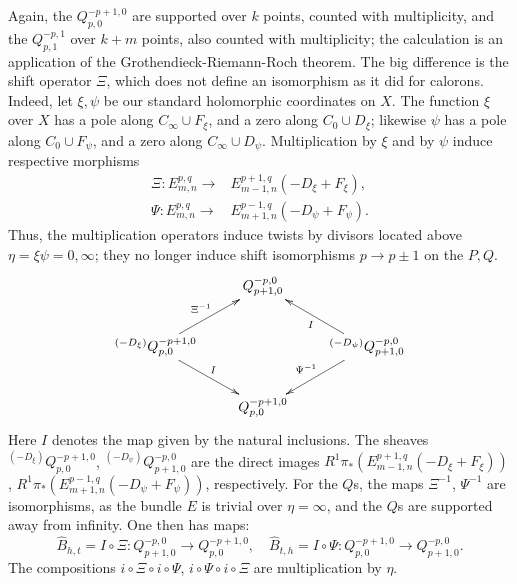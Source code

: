 \documentclass[12pt]{article}
\theoremstyle{definition}
\theoremstyle{remark}
\numberwithin{theorem}{section}
\begin{document}
Again, the $Q_{p,0}^{-p+1,0}$ are supported over $k$ points, counted with multiplicity, and the $Q_{p,1}^{-p ,1}$ over $k+m$ points, also counted with multiplicity; the calculation is an application of the Grothendieck-Riemann-Roch theorem. The big difference is the shift operator $\Xi$, which does not define an isomorphism as it did for calorons. Indeed, let $\xi,\psi$ be our standard holomorphic coordinates on $X$. 
The  function  $\xi$ over  $X$ has a pole along $ C_\infty\cup F_\xi$, and a zero along $C_0\cup D_\xi$; likewise $\psi$ has a pole along $ C_0\cup F_\psi$, and a zero along $C_\infty\cup D_\psi$. Multiplication by  $\xi$ and by $\psi$ induce respective  morphisms 
\begin{align} \Xi: E_{m,n}^{p,q}\rightarrow& E_{m-1,n}^{p+1,q}( -D_\xi+ F_\xi),\\
\Psi:E_{m,n}^{p,q}\rightarrow& E_{m+1,n}^{p-1,q}( -D_\psi+ F_\psi).
\end{align}
Thus, the multiplication operators induce twists by divisors located above $\eta = \xi\psi = 0,\infty$; they no longer induce shift isomorphisms $p\rightarrow p\pm 1$ on the $P,Q$.  
\begin{equation}\label{shift3}\xymatrix { &Q_{p+1,0}^{-p,0}&\\
^{(-D_\xi)}Q_{p ,0}^{-p+1 ,0}\ar[ur]^{\Xi^{-1}}\ar[dr]^I &&^{(-D_\psi)}Q_{p+1,0}^{-p ,0} \ar[ul]^{I}\ar[dl]_{\Psi^{-1}}\\ 
&  Q_{p ,0}^{-p+1,0}&}\end{equation}
 Here $I$ denotes the map given by the natural inclusions.  The sheaves
 $^{(-D_\xi)}Q_{p ,0}^{-p+1 ,0}$,
 $^{(-D_\psi)}Q_{p+1,0}^{-p ,0}$ are the direct images $R^1\pi_*(E_{m-1,n}^{p+1,q}( -D_\xi+ F_\xi))$, $R^1\pi_*(E_{m+1,n}^{p-1,q}( -D_\psi+ F_\psi))$, respectively.
 For the $Q$s, the maps $\Xi^{-1}$, $\Psi^{-1}$ are isomorphisms, as the bundle $E$ is trivial over $\eta =\infty$, and   the $Q$s are supported away from infinity. One then has maps:
$$\widehat B_{h,t} = I\circ \Xi: Q_{p+1,0}^{-p,0}\rightarrow Q_{p ,0}^{-p+1,0},\quad \widehat B_{t,h} = I \circ\Psi: Q_{p ,0}^{-p+1,0}\rightarrow Q_{p+1,0}^{-p,0}.$$
The compositions $i\circ \Xi\circ i\circ\Psi$, $i\circ\Psi\circ i\circ \Xi$ are multiplication by $\eta$.
 
\end{document}
